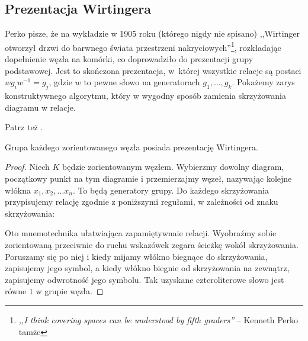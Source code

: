 
\subsection{Prezentacja Wirtingera}
%
Perko \cite{perko2016} pisze, że na wykładzie w 1905 roku (którego nigdy nie spisano) ,,Wirtinger otworzył drzwi do barwnego świata przestrzeni nakryciowych''\footnote{\emph{,,I think covering spaces can be understood by fifth graders''} -- Kenneth Perko tamże}, rozkładając dopełnienie węzła na komórki, co doprowadziło do prezentacji grupy podstawowej.
%
%
Jest to skończona prezentacja, w~której wszystkie relacje są postaci $w g_i w^{-1} = g_j$, gdzie $w$ to pewne słowo na generatorach $g_1, \ldots, g_k$.
Pokażemy zarys konstruktywnego algorytmu, który w wygodny sposób zamienia skrzyżowania diagramu w relacje.

Patrz też \cite[s. 32-39]{burde2014}.

\begin{proposition}
    Grupa każdego zorientowanego węzła posiada prezentację Wirtingera.
\end{proposition}

\begin{proof}
    Niech $K$ będzie zorientowanym węzłem.
    Wybierzmy dowolny diagram, początkowy punkt na tym diagramie i przemierzajmy węzeł, nazywając kolejne włókna $x_1, x_2, \ldots x_{n}$.
    To będą generatory grupy.
    Do każdego skrzyżowania przypisujemy relację zgodnie z poniższymi regułami, w zależności od znaku skrzyżowania:

\noindent
    Oto mnemotechnika ułatwiająca zapamiętywnaie relacji.
    Wyobraźmy sobie zorientowaną przeciwnie do ruchu wskazówek zegara ścieżkę wokół skrzyżowania.
    Poruszamy się po niej i kiedy mijamy włókno biegnące do skrzyżowania, zapisujemy jego symbol, a kiedy włókno biegnie od skrzyżowania na zewnątrz, zapisujemy odwrotność jego symbolu.
    Tak uzyskane czteroliterowe słowo jest równe $1$ w grupie węzła.
\end{proof}

